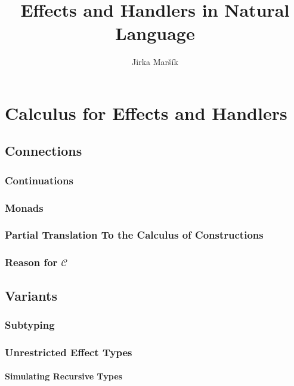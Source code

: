 \documentclass{report}
\title{Effects and Handlers in Natural Language}
\author{Jirka Maršík}
\begin{document}
\maketitle

\tableofcontents



\part{Calculus for Effects and Handlers}







\chapter{Connections}
\section{Continuations}
\section{Monads}
\section{Partial Translation To the Calculus of Constructions}
\section{Reason for $\mathcal{C}$}

\chapter{Variants}
\section{Subtyping}
\label{sec:subtyping}
\section{Unrestricted Effect Types}
\subsection{Simulating Recursive Types}

\end{document}
